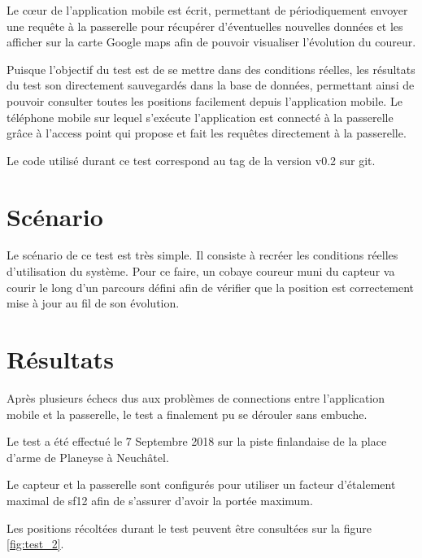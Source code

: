 Le cœur de l'application mobile est écrit, permettant de périodiquement envoyer une requête à la passerelle pour récupérer d'éventuelles nouvelles données et les afficher sur la carte Google maps afin de pouvoir visualiser l'évolution du coureur.

Puisque l'objectif du test est de se mettre dans des conditions réelles, les résultats du test son directement sauvegardés dans la base de données, permettant ainsi de pouvoir consulter toutes les positions facilement depuis l'application mobile. Le téléphone mobile sur lequel s'exécute l'application est connecté à la passerelle grâce à l'access point qui propose et fait les requêtes directement à la passerelle.

Le code utilisé durant ce test correspond au tag de la version v0.2 sur git.


\section{Scénario}

Le scénario de ce test est très simple. Il consiste à recréer les conditions réelles d'utilisation du système. Pour ce faire, un cobaye coureur muni du capteur va courir le long d'un parcours défini afin de vérifier que la position est correctement mise à jour au fil de son évolution.

\section{Résultats}

Après plusieurs échecs dus aux problèmes de connections entre l'application mobile et la passerelle, le test a finalement pu se dérouler sans embuche.

Le test a été effectué le 7 Septembre 2018 sur la piste finlandaise de la place d'arme de Planeyse à Neuchâtel.

Le capteur et la passerelle sont configurés pour utiliser un facteur d'étalement maximal de sf12 afin de s'assurer d'avoir la portée maximum.

Les positions récoltées durant le test peuvent être consultées sur la figure \ref{fig:test_2}.

